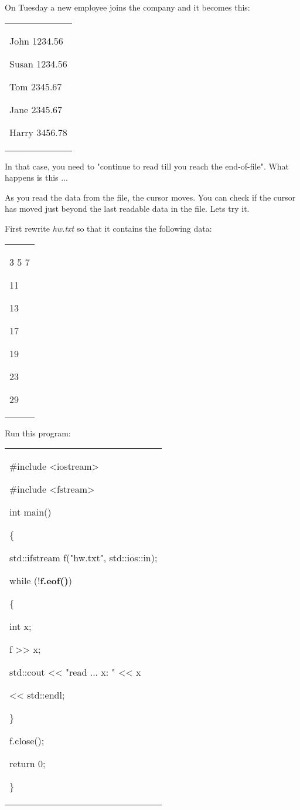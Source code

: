 \documentclass[
]{article}
\begin{document}
On Tuesday a new employee joins the company and it becomes this:

\begin{longtable}[]{@{}
  >{\raggedright\arraybackslash}p{}@{}}
\toprule\noalign{}
 \\
\midrule\noalign{}
\endhead
\bottomrule\noalign{}
\endlastfoot
John 1234.56

Susan 1234.56

Tom 2345.67

Jane 2345.67

Harry 3456.78 \\
\end{longtable}

In that case, you need to "continue to read till you reach the
end-of-file". What happens is this ...

As you read the data from the file, the cursor moves. You can check if
the cursor has moved just beyond the last readable data in the file.
Let\textquotesingle s try it.

First rewrite \emph{hw.txt} so that it contains the following data:

\begin{longtable}[]{@{}
  >{\raggedright\arraybackslash}p{}@{}}
\toprule\noalign{}
 \\
\midrule\noalign{}
\endhead
\bottomrule\noalign{}
\endlastfoot
2 3 5 7

11

13

17

19

23

29 \\
\end{longtable}

Run this program:

\begin{longtable}[]{@{}
  >{\raggedright\arraybackslash}p{}@{}}
\toprule\noalign{}
 \\
\midrule\noalign{}
\endhead
\bottomrule\noalign{}
\endlastfoot
\#include \textless iostream\textgreater{}

\#include \textless fstream\textgreater{}

int main()

\{

std::ifstream f("hw.txt", std::ios::in);

while (!\textbf{f.eof()})

\{

int x;

f \textgreater\textgreater{} x;

std::cout \textless\textless{} "read ... x: " \textless\textless{} x

\textless\textless{} std::endl;

\}

f.close();

return 0;

\} \\
\end{longtable}
\end{document}
